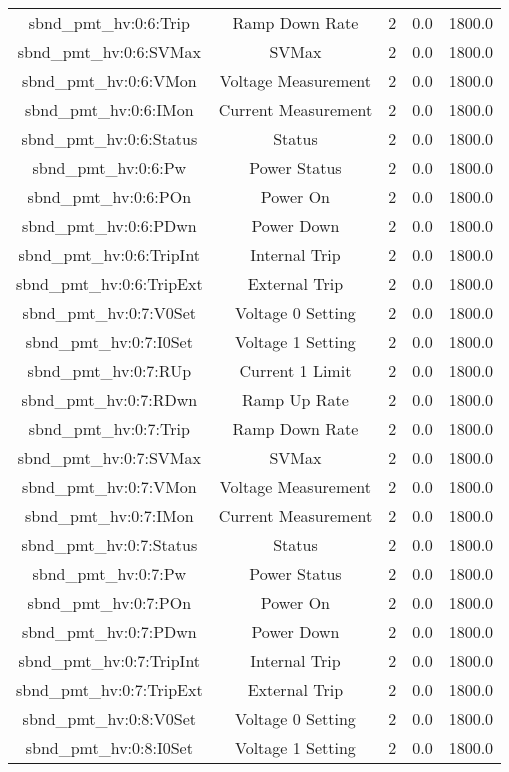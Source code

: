 \begin{center}
\begin{longtable}{c | c c c c }
sbnd\_pmt\_hv:0:6:Trip & Ramp Down Rate & 2 & 0.0 & 1800.0\\ 
sbnd\_pmt\_hv:0:6:SVMax & SVMax & 2 & 0.0 & 1800.0\\ 
sbnd\_pmt\_hv:0:6:VMon & Voltage Measurement & 2 & 0.0 & 1800.0\\ 
sbnd\_pmt\_hv:0:6:IMon & Current Measurement & 2 & 0.0 & 1800.0\\ 
sbnd\_pmt\_hv:0:6:Status & Status & 2 & 0.0 & 1800.0\\ 
sbnd\_pmt\_hv:0:6:Pw & Power Status & 2 & 0.0 & 1800.0\\ 
sbnd\_pmt\_hv:0:6:POn & Power On & 2 & 0.0 & 1800.0\\ 
sbnd\_pmt\_hv:0:6:PDwn & Power Down & 2 & 0.0 & 1800.0\\ 
sbnd\_pmt\_hv:0:6:TripInt & Internal Trip & 2 & 0.0 & 1800.0\\ 
sbnd\_pmt\_hv:0:6:TripExt & External Trip & 2 & 0.0 & 1800.0\\ 
sbnd\_pmt\_hv:0:7:V0Set & Voltage 0 Setting & 2 & 0.0 & 1800.0\\ 
sbnd\_pmt\_hv:0:7:I0Set & Voltage 1 Setting & 2 & 0.0 & 1800.0\\ 
sbnd\_pmt\_hv:0:7:RUp & Current 1 Limit & 2 & 0.0 & 1800.0\\ 
sbnd\_pmt\_hv:0:7:RDwn & Ramp Up Rate & 2 & 0.0 & 1800.0\\ 
sbnd\_pmt\_hv:0:7:Trip & Ramp Down Rate & 2 & 0.0 & 1800.0\\ 
sbnd\_pmt\_hv:0:7:SVMax & SVMax & 2 & 0.0 & 1800.0\\ 
sbnd\_pmt\_hv:0:7:VMon & Voltage Measurement & 2 & 0.0 & 1800.0\\ 
sbnd\_pmt\_hv:0:7:IMon & Current Measurement & 2 & 0.0 & 1800.0\\ 
sbnd\_pmt\_hv:0:7:Status & Status & 2 & 0.0 & 1800.0\\ 
sbnd\_pmt\_hv:0:7:Pw & Power Status & 2 & 0.0 & 1800.0\\ 
sbnd\_pmt\_hv:0:7:POn & Power On & 2 & 0.0 & 1800.0\\ 
sbnd\_pmt\_hv:0:7:PDwn & Power Down & 2 & 0.0 & 1800.0\\ 
sbnd\_pmt\_hv:0:7:TripInt & Internal Trip & 2 & 0.0 & 1800.0\\ 
sbnd\_pmt\_hv:0:7:TripExt & External Trip & 2 & 0.0 & 1800.0\\ 
sbnd\_pmt\_hv:0:8:V0Set & Voltage 0 Setting & 2 & 0.0 & 1800.0\\ 
sbnd\_pmt\_hv:0:8:I0Set & Voltage 1 Setting & 2 & 0.0 & 1800.0\\ 

\end{longtable}
\end{center}
